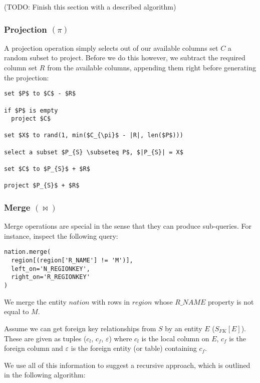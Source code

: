 \documentclass[10pt, twocolumn]{article}
\begin{document}
\spacing
\noindent
(TODO: Finish this section with a described algorithm)

\subsubsection*{Projection $(\pi)$}

A projection operation simply selects out of our available columns set $C$ a random subset to project. Before we do this however, we subtract the required column set $R$ from the available columns, appending them right before generating the projection:

\spacing
\begin{lstlisting}
set $P$ to $C$ - $R$

if $P$ is empty
  project $C$

set $X$ to rand(1, min($C_{\pi}$ - |R|, len($P$)))

select a subset $P_{S} \subseteq P$, $|P_{S}| = X$

set $C$ to $P_{S}$ + $R$

project $P_{S}$ + $R$
\end{lstlisting}

\subsubsection*{Merge $(\bowtie)$}

Merge operations are special in the sense that they can produce sub-queries. For instance, inspect the following query:

\begin{verbatim}
nation.merge(
  region[(region['R_NAME'] != 'M')],
  left_on='N_REGIONKEY',
  right_on='R_REGIONKEY'
)
\end{verbatim}

\noindent
We merge the entity $nation$ with rows in $region$ whose $R\_NAME$ property is not equal to $M$.

\spacing
\noindent
Assume we can get foreign key relationships from $S$ by an entity $E$ ($S_{FK}[E]$). These are given as tuples ($c_{l}$, $c_{f}$, $\varepsilon$) where $c_{l}$ is the local column on $E$, $c_{f}$ is the foreign column and $\varepsilon$ is the foreign entity (or table) containing $c_{f}$.

\spacing
\noindent
We use all of this information to suggest a recursive approach, which is outlined in the following algorithm:
\end{document}
